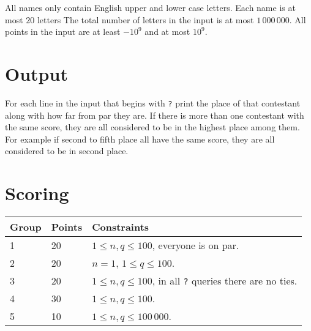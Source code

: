 All names only contain English upper and lower case letters.
Each name is at most $20$ letters
The total number of letters in the input is at most $1 \, 000 \, 000$.
All points in the input are at least $-10^9$ and at most $10^9$.

\section*{Output}
For each line in the input that begins with \texttt{?} print the place of that
contestant along with how far from par they are.
If there is more than one contestant with the same score,
they are all considered to be in the highest place among them.
For example if second to fifth place all have the same score,
they are all considered to be in second place.

\section*{Scoring}
\begin{tabular}{|l|l|l|}
\hline
Group & Points & Constraints \\ \hline
1     & 20   & $1 \leq n, q \leq 100$, everyone is on par. \\ \hline
2     & 20   & $n = 1$, $1 \leq q \leq 100$. \\ \hline
3     & 20   & $1 \leq n, q \leq 100$, in all \texttt{?} queries there are no ties. \\ \hline
4     & 30   & $1 \leq n, q \leq 100$. \\ \hline
5     & 10   & $1 \leq n, q \leq 100 \, 000$. \\ \hline
\end{tabular}
